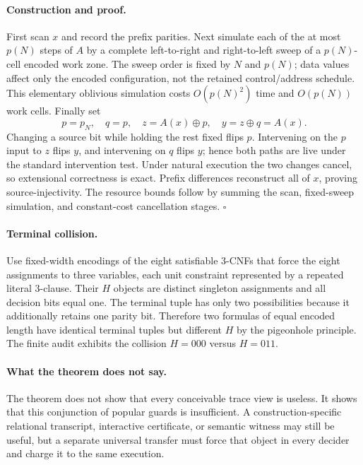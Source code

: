 \documentclass[11pt]{article}
\begin{document}
\paragraph{Construction and proof.}
First scan $x$ and record the prefix parities.  Next simulate each of the at
most $p(N)$ steps of $A$ by a complete left-to-right and right-to-left sweep of
a $p(N)$-cell encoded work zone.  The sweep order is fixed by $N$ and $p(N)$;
data values affect only the encoded configuration, not the retained
control/address schedule.  This elementary oblivious simulation costs
$O(p(N)^2)$ time and $O(p(N))$ work cells.  Finally set
\[
 p=p_N,\quad q=p,
 \quad z=A(x)\oplus p,
 \quad y=z\oplus q=A(x).
\]
Changing a source bit while holding the rest fixed flips $p$.  Intervening on
the $p$ input to $z$ flips $y$, and intervening on $q$ flips $y$; hence both
paths are live under the standard intervention test.  Under natural execution
the two changes cancel, so extensional correctness is exact.  Prefix
differences reconstruct all of $x$, proving source-injectivity.  The resource
bounds follow by summing the scan, fixed-sweep simulation, and constant-cost
cancellation stages. \hfill$\square$

\paragraph{Terminal collision.}
Use fixed-width encodings of the eight satisfiable 3-CNFs that force the eight
assignments to three variables, each unit constraint represented by a repeated
literal 3-clause.  Their $H$ objects are distinct singleton assignments and
all decision bits equal one.  The terminal tuple has only two possibilities
because it additionally retains one parity bit.  Therefore two formulas of
equal encoded length have identical terminal tuples but different $H$ by the
pigeonhole principle.  The finite audit exhibits the collision
$H=000$ versus $H=011$.

\paragraph{What the theorem does not say.}
The theorem does not show that every conceivable trace view is useless.  It
shows that this conjunction of popular guards is insufficient.  A
construction-specific relational transcript, interactive certificate, or
semantic witness may still be useful, but a separate universal transfer must
force that object in every decider and charge it to the same execution.
\end{document}
